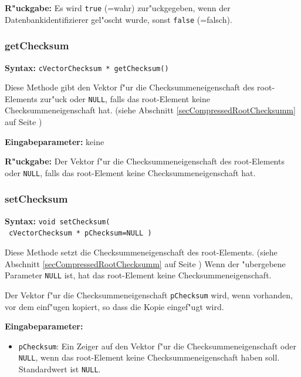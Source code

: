 \bigskip\noindent
\textbf{R"uckgabe:} Es wird \verb|true| (=wahr) zur"uckgegeben, wenn der Datenbankidentifizierer gel"oscht wurde, sonst \verb|false| (=falsch).



\subsubsection{getChecksum}

\textbf{Syntax:} \verb|cVectorChecksum * getChecksum()|

\bigskip\noindent
Diese Methode gibt den Vektor f"ur die Checksummeneigenschaft des root-Elements zur"uck oder \verb|NULL|, falls das root-Element keine Checksummeneigenschaft hat. (siehe Abschnitt \ref{secCompressedRootChecksumm} auf Seite \pageref{secCompressedRootChecksumm})

\bigskip\noindent
\textbf{Eingabeparameter:} keine

\bigskip\noindent
\textbf{R"uckgabe:} Der Vektor f"ur die Checksummeneigenschaft des root-Elements oder \verb|NULL|, falls das root-Element keine Checksummeneigenschaft hat.


\subsubsection{setChecksum}

\textbf{Syntax:} \verb|void setChecksum(| \\\verb| cVectorChecksum * pChecksum=NULL )|

\bigskip\noindent
Diese Methode setzt die Checksummeneigenschaft des root-Elements. (siehe Abschnitt \ref{secCompressedRootChecksumm} auf Seite \pageref{secCompressedRootChecksumm})
Wenn der "ubergebene Parameter \verb|NULL| ist, hat das root-Element keine Checksummeneigenschaft.

Der Vektor f"ur die Checksummeneigenschaft \verb|pChecksum| wird, wenn vorhanden, vor dem einf"ugen kopiert, so dass die Kopie eingef"ugt wird.

\bigskip\noindent
\textbf{Eingabeparameter:}
\begin{itemize}
 \item \verb|pChecksum|: Ein Zeiger auf den Vektor f"ur die Checksummeneigenschaft oder \verb|NULL|, wenn das root-Element keine Checksummeneigenschaft haben soll. Standardwert ist \verb|NULL|.
\end{itemize}

